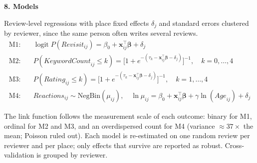 \documentclass[10pt,a4paper]{article}
\newcommand{\sect}[1]{\vspace{3pt}\noindent\textbf{#1}\par\vspace{1pt}}
\begin{document}
\clearpage

\tblCorrelations

\sect{8. Models}
Review-level regressions with place fixed effects $\delta_j$ and standard errors clustered by
reviewer, since the same person often writes several reviews.
\vspace{-6pt}
\begin{align*}
\text{M1:}\quad & \operatorname{logit} P(\textit{Revisit}_{ij}) = \beta_0 + \mathbf{x}_{ij}^\top\boldsymbol\beta + \delta_j \\[-1pt]
\text{M2:}\quad & P(\textit{KeywordCount}_{ij} \le k) = \big[1 + e^{-(\tau_k - \mathbf{x}_{ij}^\top\boldsymbol\beta - \delta_j)}\big]^{-1}, \quad k = 0,\dots,4 \\[-1pt]
\text{M3:}\quad & P(\textit{Rating}_{ij} \le k) = \big[1 + e^{-(\tau_k - \mathbf{x}_{ij}^\top\boldsymbol\beta - \delta_j)}\big]^{-1}, \quad k = 1,\dots,4 \\[-1pt]
\text{M4:}\quad & \textit{Reactions}_{ij} \sim \text{NegBin}(\mu_{ij}), \quad
                  \ln \mu_{ij} = \beta_0 + \mathbf{x}_{ij}^\top\boldsymbol\beta + \gamma \ln(\textit{Age}_{ij}) + \delta_j
\end{align*}
\vspace{-9pt}

The link function follows the measurement scale of each outcome: binary for M1, ordinal for M2 and
M3, and an overdispersed count for M4 (variance $\approx 37\times$ the mean; Poisson ruled out).
Each model is re-estimated on one random review per reviewer and per place; only effects that
survive are reported as robust. Cross-validation is grouped by reviewer.
\end{document}
